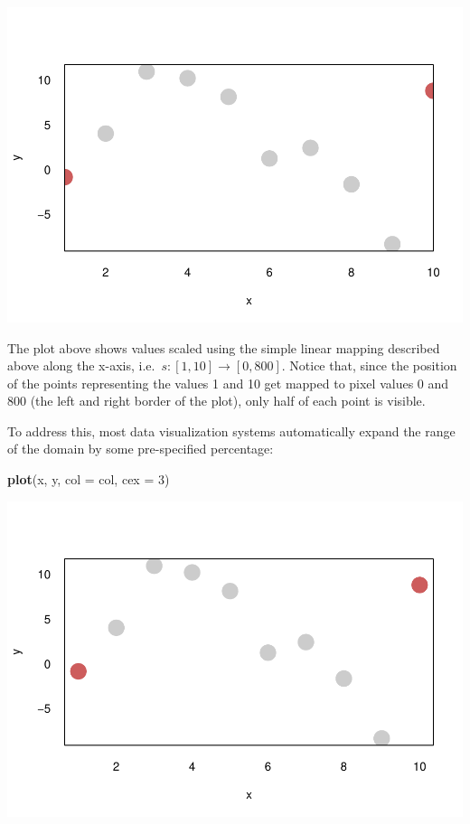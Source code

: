 \documentclass[
]{book}
\newenvironment{Shaded}{\begin{snugshade}}{\end{snugshade}}
\newcommand{\AttributeTok}[1]{\textcolor[rgb]{0.13,0.29,0.53}{#1}}
\newcommand{\DecValTok}[1]{\textcolor[rgb]{0.00,0.00,0.81}{#1}}
\newcommand{\FunctionTok}[1]{\textcolor[rgb]{0.13,0.29,0.53}{\textbf{#1}}}
\newcommand{\NormalTok}[1]{#1}
\theoremstyle{definition}
\theoremstyle{definition}
\theoremstyle{definition}
\theoremstyle{definition}
\theoremstyle{remark}
\begin{document}
\begin{center}\includegraphics[width=800px]{_main_files/figure-latex/unnamed-chunk-7-1} \end{center}

The plot above shows values scaled using the simple linear mapping described above along the x-axis, i.e.~\(s: [1, 10] \to [0, 800]\). Notice that, since the position of the points representing the values 1 and 10 get mapped to pixel values 0 and 800 (the left and right border of the plot), only half of each point is visible.

To address this, most data visualization systems automatically expand the range of the domain by some pre-specified percentage:

\begin{Shaded}
\begin{Highlighting}[]
\FunctionTok{plot}\NormalTok{(x, y, }\AttributeTok{col =}\NormalTok{ col, }\AttributeTok{cex =} \DecValTok{3}\NormalTok{)}
\end{Highlighting}
\end{Shaded}

\begin{center}\includegraphics[width=800px]{_main_files/figure-latex/unnamed-chunk-8-1} \end{center}
\end{document}
